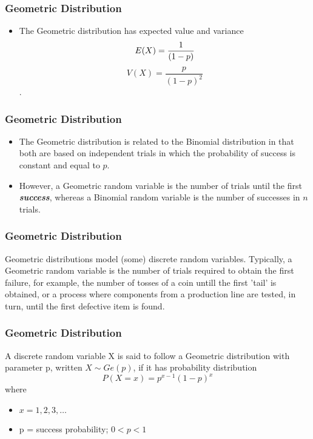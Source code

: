 \documentclass[IntroMain.tex]{subfiles}
\begin{document}
\begin{frame}
	\frametitle{Geometric Distribution}
	\Large
	\begin{itemize}
		\item The Geometric distribution has expected value and variance  \[E(X)= {1\over(1-p)}\] \[V(X)=\frac{p}{{(1-p)^2}}\].
		
	\end{itemize}
	
\end{frame}
\begin{frame}
	\frametitle{Geometric Distribution}
	\Large
	\begin{itemize}
		\item The Geometric distribution is related to the Binomial distribution in that both are based on independent trials in which the probability of success is constant and equal to $p$. 
		
		\item However, a Geometric random variable is the number of trials until the first \textit{\textbf{success}}, whereas a Binomial random variable is the number of successes in $n$ trials.
	\end{itemize}
\end{frame}
\begin{frame}
	\frametitle{Geometric Distribution}
	\Large
Geometric distributions model (some) discrete random variables. Typically, a Geometric random variable is the number of trials required to obtain the first failure, for example, the number of tosses of a coin untill the first 'tail' is obtained, or a process where components from a production line are tested, in turn, until the first defective item is found.
\end{frame}
\begin{frame}
	\frametitle{Geometric Distribution}
	\Large
A discrete random variable X is said to follow a Geometric distribution with parameter p, written $X \sim Ge(p)$, if it has probability distribution
\[P(X=x) = p^{x-1}(1-p)^x\]
where
\begin{itemize}
\item $x = 1, 2, 3, \ldots$
\item p = success probability; $0 < p < 1$
\end{itemize}
\end{frame}
\end{document}
